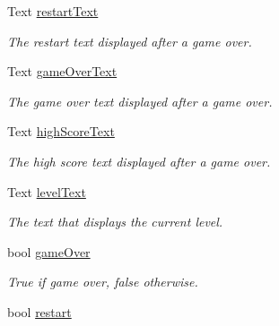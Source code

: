 \begin{DoxyCompactItemize}
Text \mbox{\hyperlink{class_player_controller_a5dacc07bd5240b4d30337caeb89d6e02}{restart\+Text}}
\begin{DoxyCompactList}\small\item\em The restart text displayed after a game over. \end{DoxyCompactList}\item 
\mbox{\label{class_player_controller_ad22c814018c51eab731676920276c38d}} 
Text \mbox{\hyperlink{class_player_controller_ad22c814018c51eab731676920276c38d}{game\+Over\+Text}}
\begin{DoxyCompactList}\small\item\em The game over text displayed after a game over. \end{DoxyCompactList}\item 
\mbox{\label{class_player_controller_a5a16f1a71fa4ce1002d8aebbcec0514b}} 
Text \mbox{\hyperlink{class_player_controller_a5a16f1a71fa4ce1002d8aebbcec0514b}{high\+Score\+Text}}
\begin{DoxyCompactList}\small\item\em The high score text displayed after a game over. \end{DoxyCompactList}\item 
\mbox{\label{class_player_controller_aa9db6bb729491dad366bc5237b2a4b2e}} 
Text \mbox{\hyperlink{class_player_controller_aa9db6bb729491dad366bc5237b2a4b2e}{level\+Text}}
\begin{DoxyCompactList}\small\item\em The text that displays the current level. \end{DoxyCompactList}\item 
\mbox{\label{class_player_controller_a2043c4af0099d9ef9b126794cdb08363}} 
bool \mbox{\hyperlink{class_player_controller_a2043c4af0099d9ef9b126794cdb08363}{game\+Over}}
\begin{DoxyCompactList}\small\item\em True if game over, false otherwise. \end{DoxyCompactList}\item 
\mbox{\label{class_player_controller_a5009280ff718bf792e6c49be57d2d961}} 
bool \mbox{\hyperlink{class_player_controller_a5009280ff718bf792e6c49be57d2d961}{restart}}

\end{DoxyCompactItemize}
